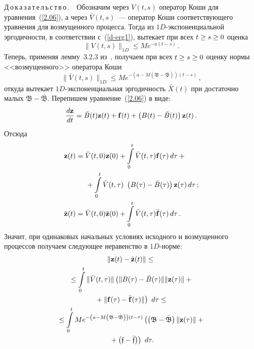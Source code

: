\begin{multicols}{2}
\noindent
Д\,о\,к\,а\,з\,а\,т\,е\,л\,ь\,с\,т\,в\,о\,.\ \
Обозначим через  $V(t, s)$ оператор Коши для уравнения~(\ref{2.06}),
а через  $\bar{V}(t, s)$~--- оператор Коши соответствующего уравнения для возмущенного процесса.
Тогда из $1D$-экс\-по\-нен\-ци\-аль\-ной эргодичности, в соответствии с~(\ref{d-erg1}),
вытекает при всех $t \hm\ge s \hm\ge 0$ оценка
\begin{equation*}
\|V(t,s)\|_{1D} \le   M e^{-a(t-s)}\,.
\end{equation*}
Теперь, применяя лемму~3.2.3 из~\cite{DK}, получаем при всех $t \hm\ge s \hm\ge 0$
оценку нормы <<возмущенного>> оператора Коши
\begin{equation*}
\|\bar{V}(t,s)\|_{1D} \le   M e^{-\left(a - M\left(\mathfrak{B-\bar{B}}\right)\right)(t-s)}\,,
\end{equation*}
откуда вытекает  $1D$-экс\-по\-нен\-ци\-аль\-ная эргодичность  $\bar{X}(t)$
при достаточно малых $\mathfrak{B-\bar{B}}$.
Перепишем уравнение~(\ref{2.06}) в виде:
\begin{equation*}
\displaystyle\frac{\displaystyle d{\mathbf z}\mathstrut}{\displaystyle dt\mathstrut}=\bar{B}(t){\mathbf z}(t) + {\bf f}(t)+\left(B(t)-\bar{B}(t)\right){\mathbf z}(t)\,.
\end{equation*}
Отсюда
\begin{align*}
{\mathbf z}(t)&=\bar{V}(t,0){\mathbf z}(0)+\int\limits_0^t \bar{V}(t,\tau){\bf{f}}(\tau) \,
d\tau+{}\\
&\hspace*{5mm}{}+\int\limits_0^t \bar{V}(t,\tau)\ \left(B(\tau) -\bar{B}(\tau)\right){\mathbf z}(\tau)\,d\tau\,;
\\
\bar{{\mathbf z}}(t)&=\bar{V}(t,0)\bar{{\mathbf z}}(0)+\int\limits_0^t
\bar{V}(t,\tau)\bar{{\mathbf f}}(\tau) \, d\tau\,.
\end{align*}
Значит, при одинаковых начальных условиях исходного и возмущенного процессов получаем
следующее неравенство в $1D$-норме:
\begin{multline*}
\left\|{\mathbf z}(t)-\bar{{\mathbf z}}(t)\right\|\le{}\\
{}\le \int\limits_0^t \|\bar{V}(t,\tau)\|
\left(\| B (\tau)-\bar{B} (\tau)\| \|{\mathbf z}(\tau)\| +{} \right.\\
\left.{}+\|
{\mathbf f}(\tau) -\bar{{\mathbf f}}(\tau)\|\right)\ d\tau \le {} \\
 {}\le \int\limits_0^t M e^{-\left(a - M\left(\mathfrak{B-\bar{B}}\right)\right)(t-\tau)}
\left(\left(\mathfrak{B-\bar{B}}\right) \|{\mathbf z}(\tau)\| + {}\right.\\
\left.{}+
\left(\mathfrak{f-\bar{f}}\right)\right)\ d\tau.
\end{multline*}


\end{multicols}
